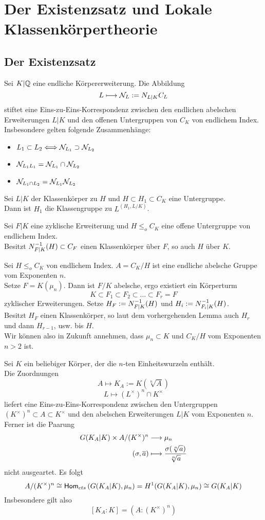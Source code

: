 \chapter{Der Existenzsatz und Lokale Klassenkörpertheorie}
\section{Der Existenzsatz}
Sei $K|\mathbb{Q}$ eine endliche Körpererweiterung. Die Abbildung
\[ L \longmapsto \mathcal{N}_L := N_{L|K}C_L \]
stiftet eine Eins-zu-Eins-Korrespondenz zwischen den endlichen abelschen Erweiterungen $L|K$ und den offenen Untergruppen von $C_K$ von endlichem Index.\\
Insbesondere gelten folgende Zusammenhänge:
\begin{itemize}
\item $L_1 \subset L_2 \overset{}{\Longleftrightarrow} \mathcal{N}_{L_1} \supset \mathcal{N}_{L_2}$
\item $\mathcal{N}_{L_1L_1} = \mathcal{N}_{L_1}\cap \mathcal{N}_{L_2}$
\item $\mathcal{N}_{L_1\cap L_2} = \mathcal{N}_{L_1} \mathcal{N}_{L_2}$
\end{itemize}

\Lem{}
Sei $L|K$ der Klassenkörper zu $H$ und $H \subset H_1 \subset C_K$ eine Untergruppe.\\
Dann ist $H_1$ die Klassengruppe zu $L^{(H_1, L/K)}$.

\Lem{}
Sei $F|K$ eine zyklische Erweiterung und $H\leq_o C_K$ eine offene Untergruppe von endlichem Index.\\
Besitzt $N_{F|K}^{-1}(H) \subset C_F$ einen Klassenkörper über $F$, so auch $H$ über $K$.

\Bem{}
Sei $H\leq_o C_K$ von endlichem Index. $A = C_K/H$ ist eine endliche abelsche Gruppe vom Exponenten $n$.\\
Setze $F = K(\mu_n)$. Dann ist $F/K$ abelsche, ergo existiert ein Körperturm
\[ K \subset F_1 \subset F_2 \subset \ldots \subset F_r = F \]
zyklischer Erweiterungen. Setze $H_F := N_{F|K}^{-1} (H)$ und $H_i := N_{F_i|K}^{-1}(H)$.\\
Besitzt $H_F$ einen Klassenkörper, so laut dem vorhergehenden Lemma auch $H_r$ und dann $H_{r-1}$, usw. bis $H$.\\
Wir können also in Zukunft annehmen, dass $\mu_n \subset K$ und $C_K/H$ vom Exponenten $n > 2$ ist.

Sei $K$ ein beliebiger Körper, der die $n$-ten Einheitswurzeln enthält.\\
Die Zuordnungen
\[ A \longmapsto K_A := K(\sqrt[n]{A}) \]
\[ L \longmapsto (L^\times)^n \cap K^\times   \]
liefert eine Eins-zu-Eins-Korrespondenz zwischen den Untergruppen $ (K^\times)^n\subset A \subset K^\times$ und den abelschen Erweiterungen $L|K$ vom Exponenten $n$.\\
Ferner ist die Paarung
\begin{align*}
G(K_A|K) \times A/(K^\times)^n & \overset{}{\longrightarrow} \mu_n\\
(\sigma, \overline{a}) &\longmapsto \frac{\sigma(\sqrt[n]{a})}{\sqrt[n]{a}}
\end{align*}
nicht ausgeartet. Es folgt
\[ A/(K^\times)^n \overset{}{\cong} \textsf{Hom}_{cts}\left(G(K_A|K), \mu_n\right) = H^1(G(K_A|K),\mu_n) \overset{}{\cong} G(K_A|K) \]
Insbesondere gilt also
\[ [K_A : K] = (A : (K^\times)^n) \]

